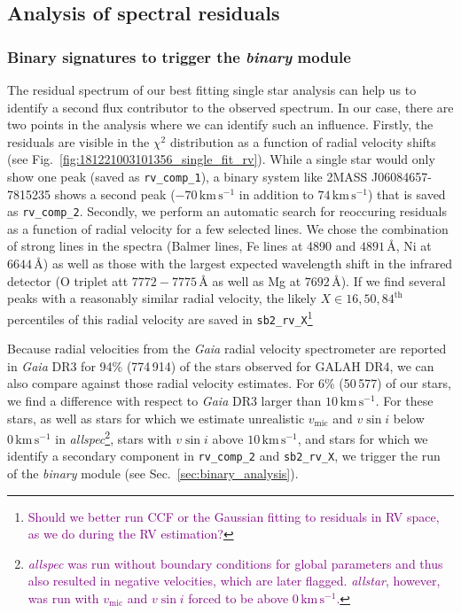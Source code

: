 \documentclass[
  journal=pasa,
  manuscript=research-paper, %
  year=2023,
  volume=37
]{cup-journal}
\newcommand{\SB}[1]{{\textcolor{purple}{#1}}}
\newcommand{\vmic}{$v_\mathrm{mic}$\xspace}
\newcommand{\vsini}{$v \sin i$\xspace}
\newcommand{\Gaia}{\textit{Gaia}\xspace}
\begin{document}
\subsection{Analysis of spectral residuals} \label{sec:residual_analysis}

\subsubsection{Binary signatures to trigger the \textit{binary} module} \label{sec:trigger_binary_module}

The residual spectrum of our best fitting single star analysis can help us to identify a second flux contributor to the observed spectrum. In our case, there are two points in the analysis where we can identify such an influence. Firstly, the residuals are visible in the $\chi^2$ distribution as a function of radial velocity shifts (see Fig.~\ref{fig:181221003101356_single_fit_rv}). While a single star would only show one peak (saved as \texttt{rv\_comp\_1}), a binary system like 2MASS J06084657-7815235 shows a second peak ($-70\,\mathrm{km\,s^{-1}}$ in addition to $74\,\mathrm{km\,s^{-1}}$) that is saved as \texttt{rv\_comp\_2}. Secondly, we perform an automatic search for reoccuring residuals as a function of radial velocity for a few selected lines. We chose the combination of strong lines in the spectra (Balmer lines, Fe lines at 4890 and $4891\,\text{\AA}$, Ni at $6644\,\text{\AA}$) as well as those with the largest expected wavelength shift in the infrared detector (O triplet att $7772-7775\,\text{\AA}$ as well as Mg at $7692\,\text{\AA}$). If we find several peaks with a reasonably similar radial velocity, the likely $X \in {16,50,84}^\text{th}$ percentiles of this radial velocity are saved in \texttt{sb2\_rv\_X}\footnote{\SB{Should we better run CCF or the Gaussian fitting to residuals in RV space, as we do during the RV estimation?}}

Because radial velocities from the \Gaia radial velocity spectrometer \citep{Katz2022} are reported in \Gaia DR3 for 94\% (774\,914) of the stars observed for GALAH DR4, we can also compare against those radial velocity estimates. For 6\% (50\,577) of our stars, we find a difference with respect to \Gaia DR3 larger than $10\,\mathrm{km\,s^{-1}}$. For these stars, as well as stars for which we estimate unrealistic \vmic and \vsini below $0\,\mathrm{km\,s^{-1}}$ in \textit{allspec}\footnote{\SB{\textit{allspec} was run without boundary conditions for global parameters and thus also resulted in negative velocities, which are later flagged. \textit{allstar}, however, was run with \vmic and \vsini forced to be above $0\,\mathrm{km\,s^{-1}}$.}}, stars with \vsini above $10\,\mathrm{km\,s^{-1}}$, and stars for which we identify a secondary component in \texttt{rv\_comp\_2} and \texttt{sb2\_rv\_X}, we trigger the run of the \textit{binary} module (see Sec.~\ref{sec:binary_analysis}).
\end{document}
